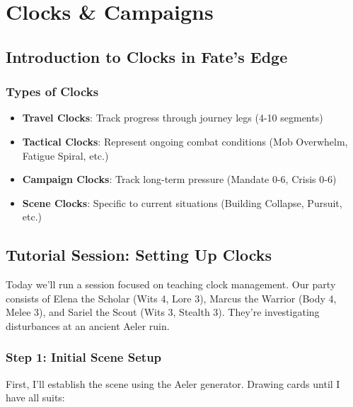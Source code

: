 \chapter{Clocks \& Campaigns}

\section*{Introduction to Clocks in Fate's Edge}


\subsection*{Types of Clocks}

\begin{itemize}[leftmargin=*]
\item \textbf{Travel Clocks}: Track progress through journey legs (4-10 segments)
\item \textbf{Tactical Clocks}: Represent ongoing combat conditions (Mob Overwhelm, Fatigue Spiral, etc.)
\item \textbf{Campaign Clocks}: Track long-term pressure (Mandate 0-6, Crisis 0-6)
\item \textbf{Scene Clocks}: Specific to current situations (Building Collapse, Pursuit, etc.)
\end{itemize}

\section*{Tutorial Session: Setting Up Clocks}

 Today we'll run a session focused on teaching clock management. Our party consists of Elena the Scholar (Wits 4, Lore 3), Marcus the Warrior (Body 4, Melee 3), and Sariel the Scout (Wits 3, Stealth 3). They're investigating disturbances at an ancient Aeler ruin.

\subsection*{Step 1: Initial Scene Setup}

 First, I'll establish the scene using the Aeler generator. Drawing cards until I have all suits:

